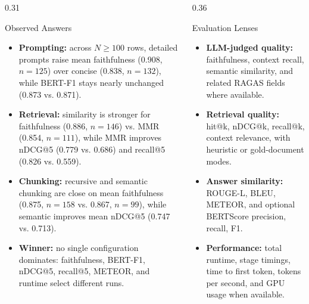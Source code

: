 \documentclass[final]{beamer}
\newcommand{\metric}[2]{\textbf{\textcolor{PosterTeal}{#1}} #2}
\newcommand{\blockheading}[2]{\faIcon{#1}\hspace{0.45em}#2}
\begin{document}
\begin{frame}[t]
\begin{columns}[T,totalwidth=\textwidth]
\begin{column}{0.31\textwidth}
\begin{block}{\blockheading{lightbulb}{Observed Answers}}
\begin{itemize}\setlength\itemsep{0.04cm}
  \item \metric{Prompting:}{across \(N \geq 100\) rows, detailed prompts raise mean faithfulness (0.908, \(n=125\)) over concise (0.838, \(n=132\)), while BERT-F1 stays nearly unchanged (0.873 vs. 0.871).}
  \item \metric{Retrieval:}{similarity is stronger for faithfulness (0.886, \(n=146\)) vs. MMR (0.854, \(n=111\)), while MMR improves nDCG@5 (0.779 vs. 0.686) and recall@5 (0.826 vs. 0.559).}
  \item \metric{Chunking:}{recursive and semantic chunking are close on mean faithfulness (0.875, \(n=158\) vs. 0.867, \(n=99\)), while semantic improves mean nDCG@5 (0.747 vs. 0.713).}
  \item \metric{Winner:}{no single configuration dominates: faithfulness, BERT-F1, nDCG@5, recall@5, METEOR, and runtime select different runs.}
\end{itemize}
\end{block}


\end{column}

\begin{column}{0.36\textwidth}

\begin{block}{\blockheading{search}{Evaluation Lenses}}
\begin{itemize}
  \item \metric{LLM-judged quality:}{faithfulness, context recall,
        semantic similarity, and related RAGAS fields where available.}
  \item \metric{Retrieval quality:}{hit@k, nDCG@k, recall@k, context relevance,
        with heuristic or gold-document modes.}
  \item \metric{Answer similarity:}{ROUGE-L, BLEU, METEOR, and optional
        BERTScore precision, recall, F1.}
  \item \metric{Performance:}{total runtime, stage timings, time to first
        token, tokens per second, and GPU usage when available.}
\end{itemize}
\end{block}



\end{column}
\end{columns}
\end{frame}
\end{document}
